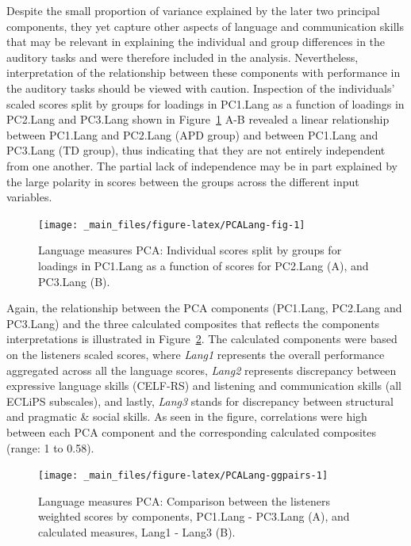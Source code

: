 \documentclass[a4paper, twoside]{templates/ociamthesis}
\begin{document}
Despite the small proportion of variance explained by the later two principal components, they yet capture other aspects of language and communication skills that may be relevant in explaining the individual and group differences in the auditory tasks and were therefore included in the analysis. Nevertheless, interpretation of the relationship between these components with performance in the auditory tasks should be viewed with caution. Inspection of the individuals' scaled scores split by groups for loadings in PC1.Lang as a function of loadings in PC2.Lang and PC3.Lang shown in Figure~\ref{fig:PCALang-fig} A-B revealed a linear relationship between PC1.Lang and PC2.Lang (APD group) and between PC1.Lang and PC3.Lang (TD group), thus indicating that they are not entirely independent from one another. The partial lack of independence may be in part explained by the large polarity in scores between the groups across the different input variables.\\

\begin{figure}

{\centering \texttt{[image: \_main\_files/figure-latex/PCALang-fig-1]} 

}

\caption{Language measures PCA: Individual scores split by groups for loadings in PC1.Lang as a function of scores for PC2.Lang (A), and PC3.Lang (B).}\label{fig:PCALang-fig}
\end{figure}

Again, the relationship between the PCA components (PC1.Lang, PC2.Lang and PC3.Lang) and the three calculated composites that reflects the components interpretations is illustrated in Figure~\ref{fig:PCALang-ggpairs}. The calculated components were based on the listeners scaled scores, where \emph{Lang1} represents the overall performance aggregated across all the language scores, \emph{Lang2} represents discrepancy between expressive language skills (CELF-RS) and listening and communication skills (all ECLiPS subscales), and lastly, \emph{Lang3} stands for discrepancy between structural and pragmatic \& social skills. As seen in the figure, correlations were high between each PCA component and the corresponding calculated composites (range: 1 to 0.58).\\

\begin{figure}

{\centering \texttt{[image: \_main\_files/figure-latex/PCALang-ggpairs-1]} 

}

\caption{Language measures PCA: Comparison between the listeners weighted scores by components, PC1.Lang - PC3.Lang (A), and calculated measures, Lang1 - Lang3 (B).}\label{fig:PCALang-ggpairs}
\end{figure}
\end{document}
